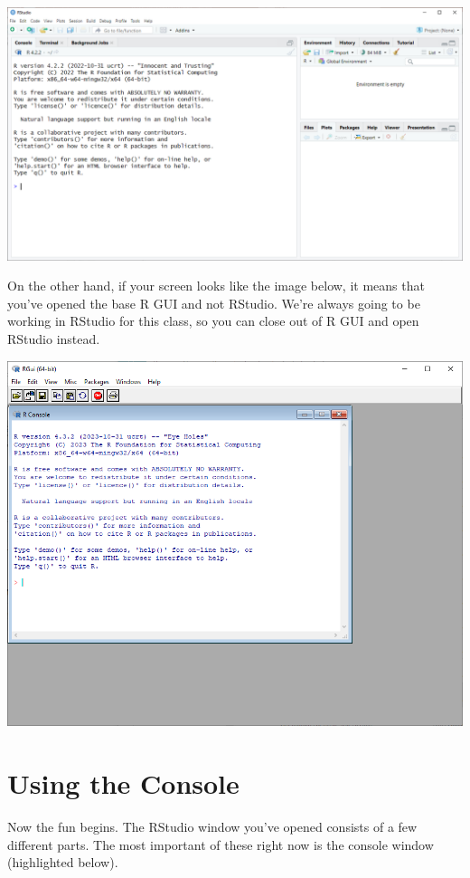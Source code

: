 \documentclass[
]{book}
\begin{document}
\includegraphics{docs/_main_files/figure-html/RStudio clean install.png}

On the other hand, if your screen looks like the image below, it means that you've opened the base R GUI and not RStudio. We're always going to be working in RStudio for this class, so you can close out of R GUI and open RStudio instead.

\includegraphics{docs/_main_files/figure-html/Base R GUI.PNG}

\hypertarget{using-the-console}{%
\section{Using the Console}\label{using-the-console}}

Now the fun begins. The RStudio window you've opened consists of a few different parts. The most important of these right now is the console window (highlighted below).
\end{document}
